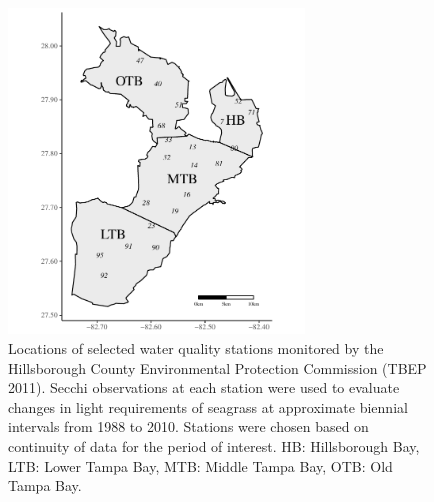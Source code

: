\documentclass[letterpaper,12pt,oneside]{article}\usepackage[]{graphicx}\usepackage[]{color}
\begin{document}
\begin{figure}
\centering
\includegraphics[width = 0.7\textwidth]{figs/FigS1.pdf}
\caption{Locations of selected water quality stations monitored by the Hillsborough County Environmental Protection Commission (TBEP 2011).  Secchi observations at each station were used to evaluate changes in light requirements of seagrass at approximate biennial intervals from 1988 to 2010. Stations were chosen based on continuity of data for the period of interest.  HB: Hillsborough Bay, LTB: Lower Tampa Bay, MTB: Middle Tampa Bay, OTB: Old Tampa Bay.}
\label{fig:tb_ts_locs}
\end{figure}

\end{document}
